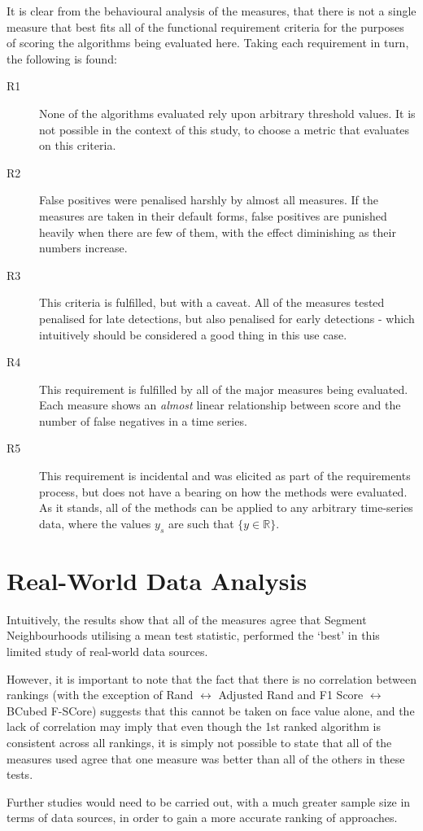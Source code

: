 \documentclass[../main.tex]{subfiles}
\begin{document}
It is clear from the behavioural analysis of the measures, that there is not a single measure that best fits all of the functional requirement criteria for the purposes of scoring the algorithms being evaluated here. Taking each requirement in turn, the following is found:

\begin{description}
    \item[R1] None of the algorithms evaluated rely upon arbitrary threshold values. It is not possible in the context of this study, to choose a metric that evaluates on this criteria.
    \item[R2] False positives were penalised harshly by almost all measures. If the measures are taken in their default forms, false positives are punished heavily when there are few of them, with the effect diminishing as their numbers increase.
    \item[R3] This criteria is fulfilled, but with a caveat. All of the measures tested penalised for late detections, but also penalised for early detections - which intuitively should be considered a good thing in this use case.
    \item[R4] This requirement is fulfilled by all of the major measures being evaluated. Each measure shows an \emph{almost} linear relationship between score and the number of false negatives in a time series.
    \item[R5] This requirement is incidental and was elicited as part of the requirements process, but does not have a bearing on how the methods were evaluated. As it stands, all of the methods can be applied to any arbitrary time-series data, where the values $y_s$ are such that $\{y \in \mathbb{R} \}$.
    \end{description}

\section{Real-World Data Analysis}

Intuitively, the results show that all of the measures agree that Segment Neighbourhoods utilising a mean test statistic, performed the `best' in this limited study of real-world data sources.

However, it is important to note that the fact that there is no correlation between rankings (with the exception of Rand $\leftrightarrow$ Adjusted Rand and F1 Score $\leftrightarrow$ BCubed F-SCore) suggests that this cannot be taken on face value alone, and the lack of correlation may imply that even though the 1st ranked algorithm is consistent across all rankings, it is simply not possible to state that all of the measures used agree that one measure was better than all of the others in these tests.

Further studies would need to be carried out, with a much greater sample size in terms of data sources, in order to gain a more accurate ranking of approaches.
\end{document}
